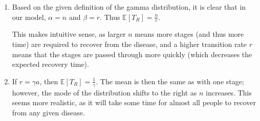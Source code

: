 \documentclass{article}
\begin{document}
\begin{enumerate}
\begin{enumerate}
		\item Based on the given definition of the gamma distribution, it is clear that in our model, $\alpha=n$ and $\beta=r$. Thus $\mathbb{E}[T_R] = \frac{n}{r} $.

		This makes intuitive sense, as larger $n$ means more stages (and thus more time) are required to recover from the disease, and a higher transition rate $r$ means that the stages are passed through more quickly (which decreases the expected recovery time).

	\item If $r = \gamma a$, then $\mathbb{E}[T_R] = \frac{1}{\gamma}$. The mean is then the same as with one stage; however, the mode of the distribution shifts to the right as $n$ increases. This seems more realistic, as it will take some time for almost all people to recover from any given disease.
	\end{enumerate}

\end{enumerate}
\end{document}
